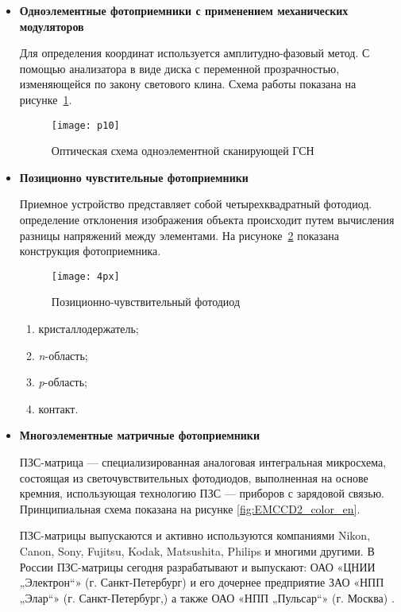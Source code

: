 \begin{itemize}
	\item \textbf{Одноэлементные фотоприемники с применением механических модуляторов}
	
	Для определения координат используется амплитудно-фазовый метод. С помощью анализатора в виде диска с переменной прозрачностью, изменяющейся по закону светового клина.  \cite[]{bibook1} Схема работы показана на рисунке~\ref{fig:p10}.
	
	\begin{figure}[ht]
		\centering
		\texttt{[image: p10]} 
		\caption{Оптическая схема одноэлементной сканирующей ГСН  }
		\label{fig:p10}
	\end{figure}

	\item \textbf{Позиционно чувстительные фотоприемники}
	
	Приемное устройство представляет собой четырехквадратный фотодиод. определение отклонения изображения объекта происходит путем вычисления разницы напряжений между элементами. На рисуноке~\ref{fig:4px} показана конструкция фотоприемника.
	
	\begin{figure}[ht]
		\centering
		\texttt{[image: 4px]} 
		\caption{Позиционно-чувствительный фотодиод}
		\label{fig:4px}
	\end{figure}
	
	\begin{enumerate}
		\item кристаллодержатель;
		\item \textit{n}-область;
		\item \textit{p}-область;
		\item контакт.
	\end{enumerate}

	\item \textbf{Многоэлементные матричные фотоприемники}
	
	ПЗС-матрица — специализированная аналоговая интегральная микросхема, состоящая из светочувствительных фотодиодов, выполненная на основе кремния, использующая технологию ПЗС — приборов с зарядовой связью. Принципиальная схема показана на рисунке \ref{fig:EMCCD2_color_en}.
	
	ПЗС-матрицы выпускаются и активно используются компаниями Nikon, Canon, Sony, Fujitsu, Kodak, Matsushita, Philips и многими другими. В России ПЗС-матрицы сегодня разрабатывают и выпускают: ОАО «ЦНИИ „Электрон“» (г. Санкт-Петербург) и его дочернее предприятие ЗАО «НПП „Элар“» (г. Санкт-Петербург,) а также ОАО «НПП „Пульсар“» (г. Москва) \cite[]{CCD}.
	

\end{itemize}
